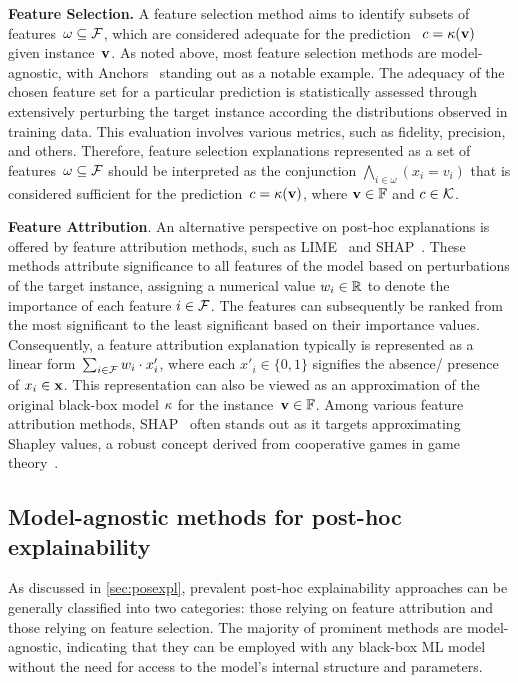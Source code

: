 \textbf{Feature Selection.} 
A feature selection method aims to identify subsets of features~$\omega \subseteq {\mathcal{F}}$, which are
considered adequate for the prediction~ $c = \kappa(\mathbf{v})$ given instance~$\mathbf{v}$.
%
As noted above, most feature selection methods are model-agnostic, with
Anchors~\cite{guestrin-aaai18} standing out as a notable example.
%
The adequacy of the chosen feature set for a particular prediction is statistically assessed through
extensively perturbing the target instance according the distributions observed in training data.
%
This evaluation involves various metrics, such as fidelity, precision, and others.
%
Therefore, feature selection explanations represented as a set of 
features~$\omega \subseteq {\mathcal{F}}$ should be interpreted as the conjunction
$\bigwedge_{i\in\omega}{(x_i=v_i)}$ that is considered sufficient for the prediction~$c = \kappa(\mathbf{v})$, where $\mathbf{v} \in \mathbb{F}$ and $c \in {\mathcal{K}}$.


\textbf{Feature Attribution}. 
An alternative perspective on post-hoc explanations is offered by feature attribution 
methods, such as LIME~\cite{guestrin-kdd16} and SHAP~\cite{lundberg-nips17}. 
%
These methods attribute significance to all features of the model based 
on perturbations of the target instance, assigning a numerical value $w_i \in \mathbb{R}$
to denote the importance of each feature $i \in {\mathcal{F}}$.
%
The features can subsequently be ranked from the most significant to the
least significant based on their importance values.
%
Consequently, a feature attribution explanation typically is represented as a linear
form~$\sum_{i\in{\mathcal{F}}}{w_i\cdot x'_i}$, where each $x'_i \in \{0, 1\}$ signifies the absence/ presence of $x_i \in \mathbf{x}$. 
%
This representation can also be viewed as an approximation of the original black-box model $\kappa$ for the instance~$\mathbf{v} \in \mathbb{F}$.
%
Among various feature attribution methods, SHAP~\cite{lundberg-nips17,barcelo-aaai21,barcelo-corr21}
often stands out as it targets approximating Shapley values, a robust
concept derived from cooperative games in game theory~\cite{shapley-ctg53}.

\subsection{Model-agnostic methods for post-hoc explainability}

As discussed in \autoref{sec:posexpl}, prevalent post-hoc explainability 
approaches can be generally classified into two categories: 
those relying on feature attribution and those relying on feature selection.
%
The majority of prominent methods are model-agnostic, indicating that they can be 
employed with any black-box ML model without the need for access to the model's 
internal structure and parameters.

